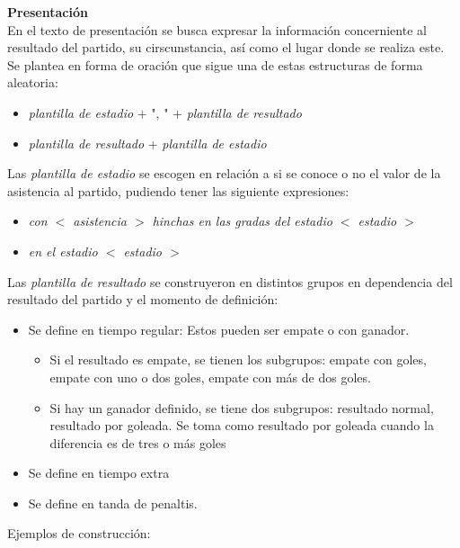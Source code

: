     \textbf{Presentación}\\

    En el texto de presentación se busca expresar la información concerniente al resultado del partido, su cirscunstancia, así como el lugar donde se 
realiza este. Se plantea en forma de oración que sigue una de estas estructuras de forma aleatoria:
    \begin{itemize}
        \item \textit{plantilla de estadio} $+$ ", " $+$ \textit{plantilla de resultado}
        \item \textit{plantilla de resultado} + \textit{plantilla de estadio}
    \end{itemize}
        
Las \textit{plantilla de estadio} se escogen en relación a si se conoce o no el valor de la asistencia al partido, pudiendo tener las siguiente expresiones:
    \begin{itemize}
        \item \textit{con  $<$ asistencia $>$ hinchas en las gradas del estadio $<$ estadio $>$}
        \item \textit{en el estadio $<$ estadio $>$}
    \end{itemize}

Las \textit{plantilla de resultado} se construyeron en distintos grupos en dependencia del resultado del partido y el momento de definición:
    \begin{itemize}
        \item Se define en tiempo regular: Estos pueden ser empate o con ganador. 
                    \begin{itemize}
                        \item Si el resultado es empate, se tienen los subgrupos: empate con goles, 
                        empate con uno o dos goles, empate con más de dos goles. 
                        \item  Si hay un ganador definido, se tiene dos subgrupos: resultado normal, 
                        resultado por goleada. Se toma como resultado por goleada cuando la diferencia es de tres o más goles
                    \end{itemize}
        \item Se define en tiempo extra
        \item Se define en tanda de penaltis.
    \end{itemize}

    Ejemplos de construcción:

